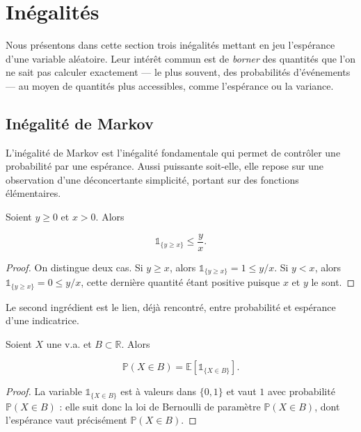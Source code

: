 \section{Inégalités}

Nous présentons dans cette section trois inégalités mettant en jeu l'espérance d'une variable aléatoire. Leur intérêt commun est de \emph{borner} des quantités que l'on ne sait pas calculer exactement — le plus souvent, des probabilités d'événements — au moyen de quantités plus accessibles, comme l'espérance ou la variance.

\subsection{Inégalité de Markov}

L'inégalité de Markov est l'inégalité fondamentale qui permet de contrôler une probabilité par une espérance. Aussi puissante soit-elle, elle repose sur une observation d'une déconcertante simplicité, portant sur des fonctions élémentaires.

\medskip

\begin{mdframed}
\begin{lemme}
Soient $y \geq 0$ et $x > 0$. Alors

$$
\mathbb{1}_{\{y \geq x\}} \leq \frac{y}{x}.
$$
\end{lemme}
\end{mdframed}

\begin{proof}
On distingue deux cas. Si $y \geq x$, alors $\mathbb{1}_{\{y \geq x\}} = 1 \leq y/x$. Si $y < x$, alors $\mathbb{1}_{\{y \geq x\}} = 0 \leq y/x$, cette dernière quantité étant positive puisque $x$ et $y$ le sont.
\end{proof}

Le second ingrédient est le lien, déjà rencontré, entre probabilité et espérance d'une indicatrice.

\medskip

\begin{mdframed}
\begin{lemme}
Soient $X$ une v.a. et $B \subset \mathbb{R}$. Alors

$$
\mathbb{P}(X \in B) = \mathbb{E}[\mathbb{1}_{\{X \in B\}}].
$$
\end{lemme}
\end{mdframed}

\begin{proof}
La variable $\mathbb{1}_{\{X \in B\}}$ est à valeurs dans $\{0, 1\}$ et vaut $1$ avec probabilité $\mathbb{P}(X \in B)$ : elle suit donc la loi de Bernoulli de paramètre $\mathbb{P}(X \in B)$, dont l'espérance vaut précisément $\mathbb{P}(X \in B)$.
\end{proof}

